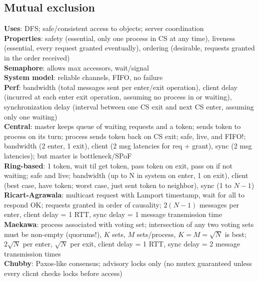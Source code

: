 \documentclass{article}
\begin{document}
\begin{multicols*}{3}
\section{Mutual exclusion}
\textbf{Uses}: DFS; safe/consistent access to objects; server coordination \\
\textbf{Properties}: safety (essential, only one process in CS at any time), liveness (essential, every request granted eventually), ordering (desirable, requests granted in the order received) \\
\textbf{Semaphore}: allows max accessors, wait/signal \\
\textbf{System model}: reliable channels, FIFO, no failure \\
\textbf{Perf}: bandwidth (total messages sent per enter/exit operation), client delay (incurred at each enter exit operation, assuming no process in or waiting), synchronization delay (interval between one CS exit and next CS enter, assuming only one waiting) \\
\textbf{Central}: master keeps queue of waiting requests and a token; sends token to process on its turn; process sends token back on CS exit; safe, live, and FIFO!; bandwidth (2 enter, 1 exit), client (2 msg latencies for req + grant), sync (2 msg latencies); but master is bottleneck/SPoF \\
\textbf{Ring-based}: 1 token, wait til get token, pass token on exit, pass on if not waiting; safe and live; bandwidth (up to N in system on enter, 1 on exit), client (best case, have token; worst case, just sent token to neighbor), sync (1 to $N-1$) \\
\textbf{Ricart-Agrawala}: multicast request with Lamport timestamp, wait for all to respond OK; requests granted in order of causality; $2(N-1)$ messages per enter, client delay = 1 RTT, sync delay = 1 message transmission time \\
\textbf{Maekawa}: process associated with voting set; intersection of any two voting sets must be non-empty (quorums!), $K$ sets, $M$ sets/process, $K=M=\sqrt{N}$ is best; $2\sqrt{N}$ per enter, $\sqrt{N}$ per exit, client delay = 1 RTT, sync delay = 2 message transmission times \\
\textbf{Chubby}: Paxos-like consensus; advisory locks only (no mutex guaranteed unless every clicnt checks locks before access)


\end{multicols*}
\end{document}
